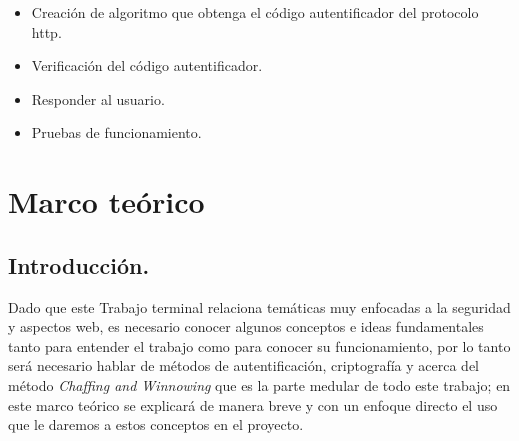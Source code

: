 \documentclass[12pt, a4paper, titlepage]{report}
\begin{document}
\begin{enumerate}
\begin{itemize}
                \begin{itemize}
                    \item Creación de algoritmo que obtenga el código autentificador del protocolo \acrshort{http}.
                    \item Verificación del código autentificador.
                    \item Responder al usuario.
                    \item Pruebas de funcionamiento.
                \end{itemize}
            \end{itemize}
        \end{enumerate}
	
	\chapter{\textcolor{azulescom}{Marco teórico}}
	    
	    \section{Introducci\'on.}
	        Dado que este Trabajo terminal relaciona temáticas muy enfocadas a la seguridad y aspectos web, es necesario conocer algunos conceptos e ideas fundamentales tanto para entender el trabajo como para conocer su funcionamiento, por lo tanto será necesario hablar de métodos de autentificación, criptografía y acerca del método \textit{Chaffing and Winnowing} que es la parte medular de todo este trabajo; en este marco teórico se explicará de manera breve y con un enfoque directo el uso que le daremos a estos conceptos en el proyecto.
\end{document}
